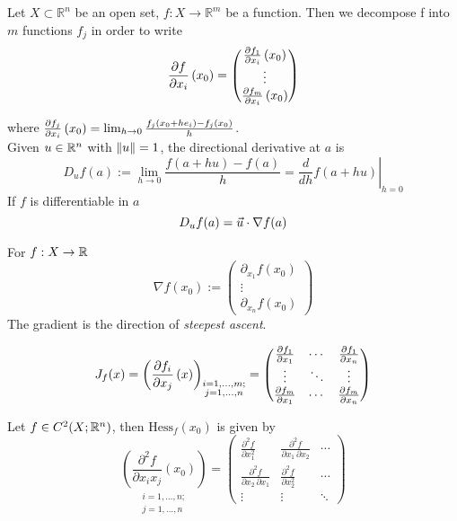  Let $X\subset\mathbb{R}^n$ be an open set, $f\colon X \to \mathbb{R}^m$ be a function. Then we decompose f into $m$ functions $f_j$ in order to write
$$\frac{\partial f}{\partial x_i}\left(x_{0}\right) = \begin{pmatrix}
								   \frac{\partial f_1}{\partial x_i}\left(x_{0}\right)
								   \\ \vdots \\
								   \frac{\partial f_m}{\partial x_i}\left(x_{0}\right)
								   \end{pmatrix}$$

where $\frac{\partial f_j}{\partial x_i}\left(x_{0}\right) = \lim_{h \rightarrow 0} \frac{f_j(x_0+h e_i)-f_j(x_0)}{h}$. \\

 Given $u \in \mathbb{R}^n$ with $\left\lVert u \right\rVert=1$, the directional derivative at $a$ is
$$D_uf(a) := \lim_{h\to0}\frac{f(a + hu) -f(a)}{h} =
		\left.\frac{d}{dh}f(a+hu)\right|_{h = 0}$$
If $f$ is differentiable in $a$
$$ D_u f(a) = \vec{u} \cdot \nabla f(a)$$

\Def[Gradient] For $f : X \rightarrow \mathbb{R}$
$$ \nabla f (x_0) := \begin{pmatrix}\partial_{x_1}f(x_0)\\\vdots\\\partial_{x_n}f(x_0)\end{pmatrix}$$
The gradient is the direction of \textit{steepest ascent}.

$$
J_f(x) = \left(\frac{\partial f_i}{\partial x_j}\left(x\right)\right)_{\substack{ i= 1,\dots,m;\\ j=1,\dots,n}} = 
    \begin{pmatrix}{\frac {\partial f_{1}}{\partial x_{1}}}&\cdots &{\frac {\partial f_{1}}{\partial x_{n}}}\\\vdots &\ddots &\vdots \\{\frac {\partial f_{m}}{\partial x_{1}}}&\cdots &{\frac {\partial f_{m}}{\partial x_{n}}}\end{pmatrix}
$$

 Let $f \in C^2(X;\mathbb{R}^n)$, then $\text{Hess}_f(x_0)$ is given by
$$
 \underset{\substack{ i= 1,\dots,n;\\ j=1,\dots,n}}{\left(\frac{\partial ^{2}f}{\partial x_{i} x_j}\left(x_0\right)\right)} =
\begin{pmatrix}{\frac {\partial ^{2}f}{\partial x_{1}^{2}}}&{\frac {\partial ^{2}f}{\partial x_{1}\,\partial x_{2}}}&\cdots
\\[2.2ex]{\frac {\partial ^{2}f}{\partial x_{2}\,\partial x_{1}}}&{\frac {\partial ^{2}f}{\partial x_{2}^{2}}}&\cdots 
\\[2.2ex]\vdots &\vdots &\ddots  \end{pmatrix}
$$



